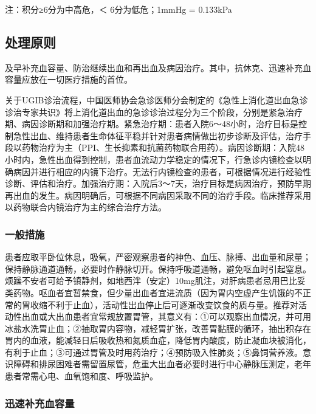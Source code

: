注：积分≥6分为中高危，＜ 6分为低危；1mmHg = 0.133kPa

\subsection{处理原则}

及早补充血容量、防治继续出血和再出血及病因治疗。其中，抗休克、迅速补充血容量应放在一切医疗措施的首位。

关于UGIB诊治流程，中国医师协会急诊医师分会制定的《急性上消化道出血急诊诊治专家共识》将上消化道出血的急诊诊治过程分为三个阶段，分别是紧急治疗期、病因诊断期和加强治疗期。紧急治疗期：患者入院6～48小时，治疗目标是控制急性出血、维持患者生命体征平稳并针对患者病情做出初步诊断及评估，治疗手段以药物治疗为主（PPI、生长抑素和抗菌药物联合用药）。病因诊断期：入院48小时内，急性出血得到控制，患者血流动力学稳定的情况下，行急诊内镜检查以明确病因并进行相应的内镜下治疗。无法行内镜检查的患者，可根据情况进行经验性诊断、评估和治疗。加强治疗期：入院后3～7天，治疗目标是病因治疗，预防早期再出血的发生。病因明确后，可根据不同病因采取不同的治疗手段。临床推荐采用以药物联合内镜治疗为主的综合治疗方法。

\subsubsection{一般措施}

患者应取平卧位休息，吸氧，严密观察患者的神色、血压、脉搏、出血量和尿量；保持静脉通道通畅，必要时作静脉切开。保持呼吸道通畅，避免呕血时引起窒息。烦躁不安者可给予镇静剂，如地西泮（安定）10mg肌注，对肝病患者忌用巴比妥类药物。呕血者宜暂禁食，但少量出血者宜进流质（因为胃内空虚产生饥饿的不正常的胃收缩不利于止血），活动性出血停止后可逐渐改变饮食的质与量。推荐对活动性出血或大出血患者宜常规放置胃管，其意义有：①可以观察出血情况，并可用冰盐水洗胃止血；②抽取胃内容物，减轻胃扩张，改善胃黏膜的循环，抽出积存在胃内的血液，能减轻日后吸收热和氮质血症，降低胃内酸度，防止凝血块被消化，有利于止血；③可通过胃管及时用药治疗；④预防吸入性肺炎；⑤鼻饲营养液。意识障碍和排尿困难者需留置尿管，危重大出血者必要时进行中心静脉压测定，老年患者常需心电、血氧饱和度、呼吸监护。

\subsubsection{迅速补充血容量}

